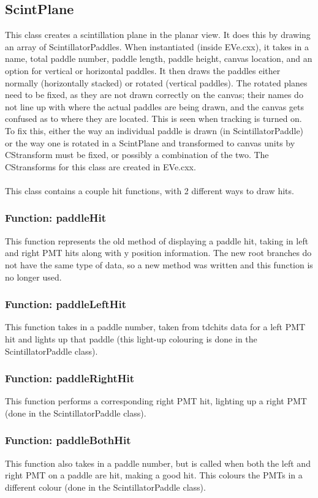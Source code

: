 \documentclass[12pt]{article}
\numberwithin{equation}{section}
\begin{document}
\subsection{ScintPlane}
This class creates a scintillation plane in the planar view. It does this by drawing an array of ScintillatorPaddles. When instantiated (inside EVe.cxx), it takes in a name, total paddle number, paddle length, paddle height, canvas location, and an option for vertical or horizontal paddles. It then draws the paddles either normally (horizontally stacked) or rotated (vertical paddles). The rotated planes need to be fixed, as they are not drawn correctly on the canvas; their names do not line up with where the actual paddles are being drawn, and the canvas gets confused as to where they are located. This is seen when tracking is turned on. To fix this, either the way an individual paddle is drawn (in ScintillatorPaddle) or the way one is rotated in a ScintPlane and transformed to canvas units by CStransform must be fixed, or possibly a combination of the two. The CStransforms for this class are created in EVe.cxx. 
\\
\\
This class contains a couple hit functions, with 2 different ways to draw hits.

\subsubsection{Function: paddleHit}
This function represents the old method of displaying a paddle hit, taking in left and right PMT hits along with y position information. The new root branches do not have the same type of data, so a new method was written and this function is no longer used.

\subsubsection{Function: paddleLeftHit}
This function takes in a paddle number, taken from tdchits data for a left PMT hit and lights up that paddle (this light-up colouring is done in the ScintillatorPaddle class).

\subsubsection{Function: paddleRightHit}
This function performs a corresponding right PMT hit, lighting up a right PMT (done in the ScintillatorPaddle class).

\subsubsection{Function: paddleBothHit}
This function also takes in a paddle number, but is called when both the left and right PMT on a paddle are hit, making a good hit. This colours the PMTs in a different colour (done in the ScintillatorPaddle class).
\end{document}
